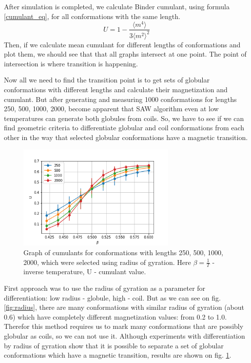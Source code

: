 \documentclass[a4paper,12pt]{article}
\begin{document}
After simulation is completed, we calculate Binder cumulant\cite{Binder_cumulant}, using formula \ref{cumulant_eq}, for all conformations with the same length.
\begin{equation}
	U = 1 - \frac{\langle m^4\rangle}{3\langle m^2\rangle ^ 2}
	\label{cumulant_eq}
\end{equation}
Then, if we calculate mean cumulant for different lengths of conformations and plot them, we should see that that all graphs intersect at one point. The point of intersection is where transition is happening.

Now all we need to find the transition point is to get sets of globular conformations with different lengths and calculate their magnetization and cumulant. But after generating and measuring 1000 conformations for lengths 250, 500, 1000, 2000, become apparent that SAW algorithm even at low temperatures can generate both globules from coils. So, we have to see if we can find geometric criteria to differentiate globular and coil conformations from each other in the way that selected globular conformations have a magnetic transition.


\begin{figure}[h]
	\centering
	\includegraphics[width=0.7\textwidth]{images/Cumulant_beta0.4_0.6_no_title.png} 
	\caption{Graph of cumulants for conformations with lengths 250, 500, 1000, 2000, which were selected using radius of gyration. Here $\beta = \frac{1}{T}$ - inverse temperature, U - cumulant value.}
	\label{fig:cumulant}
\end{figure}

First approach was to use the radius of gyration as a parameter for differentiation: low radius - globule, high - coil. But as we can see on fig.\ref{fig:radius}, there are many conformations with similar radius of gyration (about 0.6) which have completely different magnetization values: from 0.2 to 1.0. Therefor this method requires us to mark many conformations that are possibly globular as coils, so we can not use it.
Although experiments with differentiation by radius of gyration show that it is possible to separate a set of globular conformations which have a magnetic transition, results are shown on fig. \ref{fig:cumulant}.
\end{document}
